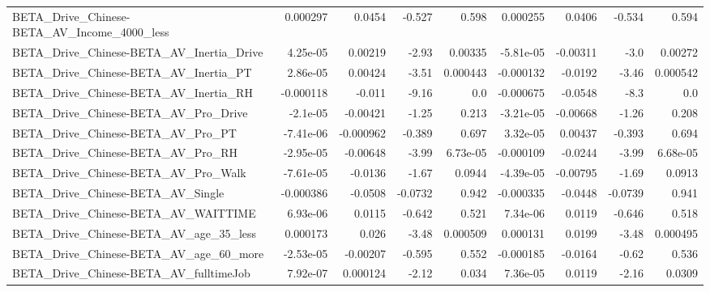\begin{tabular}{lrrrrrrrr}
BETA\_Drive\_Chinese-BETA\_AV\_Income\_4000\_less        &    0.000297 &       0.0454 &   -0.527 &    0.598 &   0.000255 &      0.0406 &       -0.534 &         0.594 \\
BETA\_Drive\_Chinese-BETA\_AV\_Inertia\_Drive           &    4.25e-05 &      0.00219 &    -2.93 &  0.00335 &  -5.81e-05 &    -0.00311 &         -3.0 &       0.00272 \\
BETA\_Drive\_Chinese-BETA\_AV\_Inertia\_PT              &    2.86e-05 &      0.00424 &    -3.51 & 0.000443 &  -0.000132 &     -0.0192 &        -3.46 &      0.000542 \\
BETA\_Drive\_Chinese-BETA\_AV\_Inertia\_RH              &   -0.000118 &       -0.011 &    -9.16 &      0.0 &  -0.000675 &     -0.0548 &         -8.3 &           0.0 \\
BETA\_Drive\_Chinese-BETA\_AV\_Pro\_Drive               &    -2.1e-05 &     -0.00421 &    -1.25 &    0.213 &  -3.21e-05 &    -0.00668 &        -1.26 &         0.208 \\
BETA\_Drive\_Chinese-BETA\_AV\_Pro\_PT                  &   -7.41e-06 &    -0.000962 &   -0.389 &    0.697 &   3.32e-05 &     0.00437 &       -0.393 &         0.694 \\
BETA\_Drive\_Chinese-BETA\_AV\_Pro\_RH                  &   -2.95e-05 &     -0.00648 &    -3.99 & 6.73e-05 &  -0.000109 &     -0.0244 &        -3.99 &      6.68e-05 \\
BETA\_Drive\_Chinese-BETA\_AV\_Pro\_Walk                &   -7.61e-05 &      -0.0136 &    -1.67 &   0.0944 &  -4.39e-05 &    -0.00795 &        -1.69 &        0.0913 \\
BETA\_Drive\_Chinese-BETA\_AV\_Single                  &   -0.000386 &      -0.0508 &  -0.0732 &    0.942 &  -0.000335 &     -0.0448 &      -0.0739 &         0.941 \\
BETA\_Drive\_Chinese-BETA\_AV\_WAITTIME                &    6.93e-06 &       0.0115 &   -0.642 &    0.521 &   7.34e-06 &      0.0119 &       -0.646 &         0.518 \\
BETA\_Drive\_Chinese-BETA\_AV\_age\_35\_less             &    0.000173 &        0.026 &    -3.48 & 0.000509 &   0.000131 &      0.0199 &        -3.48 &      0.000495 \\
BETA\_Drive\_Chinese-BETA\_AV\_age\_60\_more             &   -2.53e-05 &     -0.00207 &   -0.595 &    0.552 &  -0.000185 &     -0.0164 &        -0.62 &         0.536 \\
BETA\_Drive\_Chinese-BETA\_AV\_fulltimeJob             &    7.92e-07 &     0.000124 &    -2.12 &    0.034 &   7.36e-05 &      0.0119 &        -2.16 &        0.0309 \\

\end{tabular}
